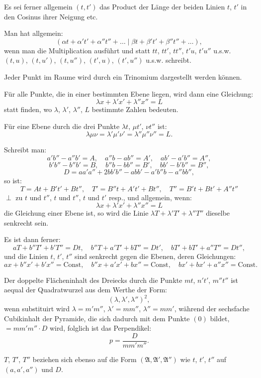 \documentclass[12pt,a4paper]{article}
\begin{document}
Es sei ferner allgemein $(t, t')$ das Product der Länge der beiden Linien $t$, $t'$ in den Cosinus ihrer
Neigung etc.

Man hat allgemein:
\[
(\alpha t + \alpha' t' + \alpha'' t'' + \ldots \mid \beta t + \beta' t' + \beta'' t'' + \ldots),
\]
wenn man die Multiplication ausführt und statt $tt$, $tt'$, $tt''$, $t'u$, $t'u''$ u.s.w.
$(t, u)$, $(t, u')$, $(t, u'')$, $(t', u)$, $(t', u'')$ u.s.w. schreibt.

Jeder Punkt im Raume wird durch ein Trinomium dargestellt werden können.

Für alle Punkte, die in einer bestimmten Ebene liegen, wird dann eine Gleichung:
\[
\lambda x + \lambda' x' + \lambda'' x'' = L
\]
statt finden, wo $\lambda$, $\lambda'$, $\lambda''$, $L$ bestimmte Zahlen bedeuten.

Für eine Ebene durch die drei Punkte $\lambda t$, $\mu t'$, $\nu t''$ ist:
\[
\lambda \mu \nu = \lambda' \mu' \nu' = \lambda'' \mu'' \nu'' = L.
\]

Schreibt man:
\[
a'b'' - a''b' = A, \quad a''b - ab'' = A', \quad ab' - a'b'' = A'',
\]
\[
b'b'' - b''b' = B, \quad b''b - bb'' = B', \quad bb' - b'b'' = B'',
\]
\[
D = aa'a'' + 2bb'b'' - abb' - a'b''b - a''bb'',
\]
so ist:
\[
T = A t + B' t' + B t'', \quad T' = B'' t + A' t' + B t'', \quad T'' = B' t + B t' + A'' t''
\]
$\perp$ zu $t$ und $t''$, $t$ und $t''$, $t$ und $t'$ resp., und allgemein, wenn:
\[
\lambda x + \lambda' x' + \lambda'' x'' = L
\]
die Gleichung einer Ebene ist, so wird die Linie $\lambda T + \lambda' T' + \lambda'' T''$ dieselbe senkrecht sein.

Es ist dann ferner:
\[
aT + b''T' + b'T'' = Dt, \quad b''T + a'T' + bT'' = Dt', \quad bT' + bT' + a''T'' = Dt'',
\]
und die Linien $t$, $t'$, $t''$ sind senkrecht gegen die Ebenen, deren Gleichungen:
\[
ax + b''x' + b'x'' = \text{Const}, \quad b''x + a'x' + bx'' = \text{Const}, \quad bx' + bx' + a''x'' = \text{Const}.
\]

Der doppelte Flächeninhalt des Dreiecks durch die Punkte $mt$, $n't'$, $m''t''$ ist aequal der
Quadratwurzel aus dem Werthe der Form:
\[
(\lambda, \lambda', \lambda'')^2,
\]
wenn substituirt wird $\lambda = m'm''$, $\lambda' = mm''$, $\lambda'' = mm'$, während der sechsfache Cubikinhalt
der Pyramide, die sich dadurch mit dem Punkte $(0)$ bildet, $= m m' m'' \cdot D$ wird, folglich ist das
Perpendikel:
\[
p = \frac{D}{m m' m''}.
\]

$T$, $T'$, $T''$ beziehen sich ebenso auf die Form $(\mathfrak{A}, \mathfrak{A}', \mathfrak{A}'')$ wie $t$, $t'$, $t''$ auf
$(a, a', a'')$ und $D$.
\end{document}
